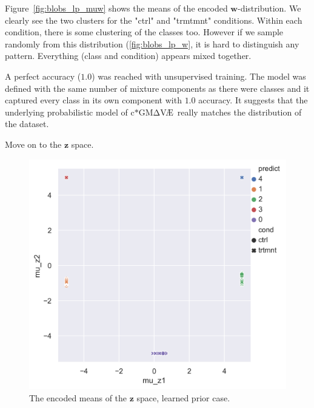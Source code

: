 \documentclass[11pt, a4paper]{report}
\theoremstyle{plain}
\theoremstyle{definition}
\theoremstyle{remark}
\newcommand{\z}{\mathbf{z}}
\newcommand{\w}{\mathbf{w}}
\newcommand{\gmvae}{c$\ast$GM$\mathrm{\Delta}$V\AE~}
\begin{document}
Figure~\ref{fig:blobs_lp_muw} shows the means of the encoded $\w$-distribution.
We clearly see the two clusters for the "ctrl" and "trmtmnt" conditions.
Within each condition, there is some clustering of the classes too.
However if we sample randomly from this distribution (\ref{fig:blobs_lp_w}, it
is hard to distinguish any pattern. Everything (class and condition) appears
mixed together.

A perfect accuracy ($1.0$) was reached with unsupervised training.
The model was defined with the same number of mixture components as there were 
classes and it captured every class in its own component with $1.0$ accuracy.
It suggests that the underlying probabilistic model of \gmvae really matches 
the distribution of the dataset.

Move on to the $\z$ space.

\begin{figure}[h]
\centering
\includegraphics[width=1.1\textwidth]{images/blobs_cgmvae_learnedprior_mu_z.png}
\caption{The encoded means of the $\z$ space, learned prior case.
}
\label{fig:blobs_lp_muz}
\end{figure}
\end{document}

